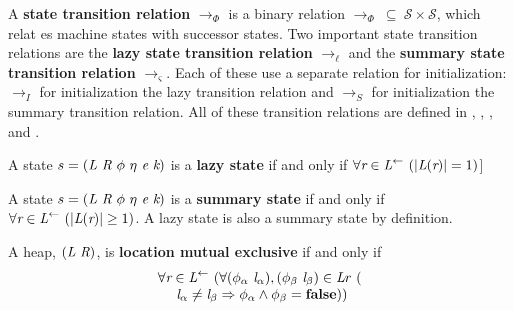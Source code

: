 \begin{definition}
A \textbf{state transition relation} $\rightarrow_{\Phi}$ is a binary relation $\rightarrow_{\Phi}\ \subseteq\ \mathcal{S} \times \mathcal{S} $, which relat
es machine states with successor states. Two important state transition relations are the \textbf{lazy state transition relation} $\rightarrow_\ell$ and the \textbf{summary state transition relation} $\rightarrow_\varsigma$. Each of these use a separate relation for initialization: $\rightarrow_I$ for initialization the lazy transition relation and $\rightarrow_S$ for initialization the summary transition relation. All of these transition relations are defined in , , , and .
\end{definition}

\begin{definition}
A state $s = (\cfgnt{L}\ \cfgnt{R}\ \phi\ \eta\ \cfgnt{e}\ \cfgnt{k})$ is a \textbf{lazy state} if and only if $\forall \emph{r} \in \emph{L}^\leftarrow\ (|\emph{L}(\emph{r})| = 1)$]
\end{definition}

\begin{definition}
A state $s = (\cfgnt{L}\ \cfgnt{R}\ \phi\ \eta\ \cfgnt{e}\ \cfgnt{k})$ is a \textbf{summary state} if and only if 
$\forall \emph{r} \in \emph{L}^\leftarrow\ (|\emph{L}(\emph{r})| \ge 1)$.
A lazy state is also a summary state by definition.
\end{definition}

\begin{definition}
A heap, $(\emph{L}\ \emph{R})$, is \textbf{location mutual exclusive} if and only if 
\[
\begin{array}{l}
\forall \cfgnt{r} \in \cfgnt{L}^\leftarrow\ (\forall (\phi_\alpha\ \cfgnt{l}_\alpha),(\phi_\beta\ \cfgnt{l}_\beta) \in \cfgnt{L}{r}\ (\\
\ \ \ \ \cfgnt{l}_\alpha \neq \cfgnt{l}_\beta \Rightarrow \phi_\alpha \wedge \phi_\beta = \cfgt{false}))
\end{array}
\]
\end{definition}
%

